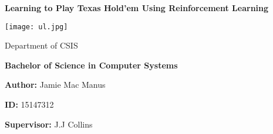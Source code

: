 
\begin{titlepage}

    \begin{center}

        \vspace*{1.5cm}

        \Huge

        \textbf{Learning to Play Texas Hold'em Using Reinforcement Learning}

        \texttt{[image: ul.jpg]}

        \Large
        Department of CSIS

        \vspace{.25cm}
        \textbf{Bachelor of Science in Computer Systems}

        \vspace{.25cm}
        \textbf{Author: } Jamie Mac Manus

        \vspace{.25cm}
        \textbf{ID: } 15147312

        \vspace{.25cm}
        \textbf{Supervisor: } J.J Collins

    \end{center}

\end{titlepage}